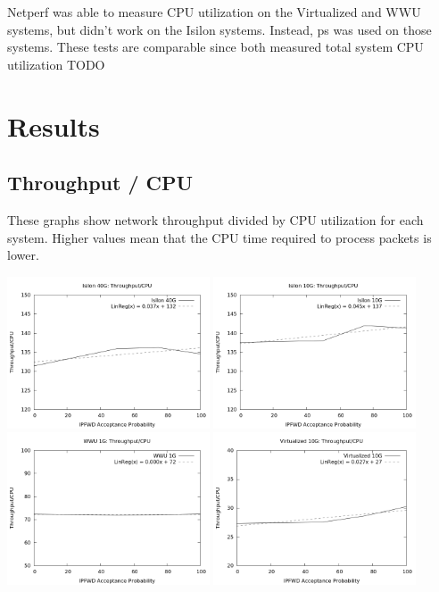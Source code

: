 \documentclass[journal]{IEEEtran}
\begin{document}
  Netperf was able to measure CPU utilization on the Virtualized and WWU
  systems, but didn't work on the Isilon systems. Instead, ps was used on those
  systems.  These tests are comparable since both measured total system CPU
  utilization TODO


\section{Results}
  
  \subsection{Throughput / CPU}
  These graphs show network throughput divided by CPU utilization for each system. Higher values mean that the CPU time required to process packets is lower.
  
  \begin{center}
  \includegraphics[width=0.45\textwidth]{toc_isilon40}
  \includegraphics[width=0.45\textwidth]{toc_isilon10}
  \includegraphics[width=0.45\textwidth]{toc_wwu1}
  \includegraphics[width=0.45\textwidth]{toc_virtual10}
  \end{center}
  
\end{document}
